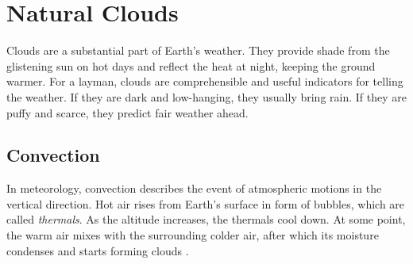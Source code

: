 \section{Natural Clouds}
Clouds are a substantial part of Earth's weather. They provide shade from the glistening sun on hot days and reflect the heat at night, keeping the ground warmer.
For a layman, clouds are comprehensible and useful indicators for telling the weather.
If they are dark and low-hanging, they usually bring rain.
If they are puffy and scarce, they predict fair weather ahead.

\subsection{Convection}
\label{section:clouds:convection}
In meteorology, \gls{convection} describes the event of atmospheric motions in the vertical direction.
Hot air rises from Earth's surface in form of bubbles, which are called \emph{\gls{thermal}s}.
As the \gls{altitude} increases, the thermals cool down. At some point, the warm air mixes with the surrounding colder air, after which its moisture condenses and starts forming clouds \cite{weather:convection}.

\begin{figure}[H]
    \centering
    \label{img:tikz:convection}
\end{figure}


